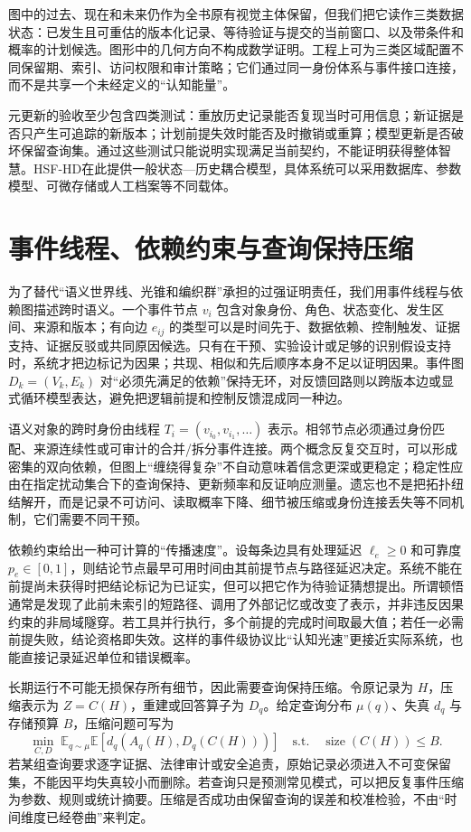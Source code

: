 图中的过去、现在和未来仍作为全书原有视觉主体保留，但我们把它读作三类数据状态：已发生且可重估的版本化记录、等待验证与提交的当前窗口、以及带条件和概率的计划候选。图形中的几何方向不构成数学证明。工程上可为三类区域配置不同保留期、索引、访问权限和审计策略；它们通过同一身份体系与事件接口连接，而不是共享一个未经定义的“认知能量”。

元更新的验收至少包含四类测试：重放历史记录能否复现当时可用信息；新证据是否只产生可追踪的新版本；计划前提失效时能否及时撤销或重算；模型更新是否破坏保留查询集。通过这些测试只能说明实现满足当前契约，不能证明获得整体智慧。HSF-HD在此提供一般状态—历史耦合模型，具体系统可以采用数据库、参数模型、可微存储或人工档案等不同载体。

\section{事件线程、依赖约束与查询保持压缩}

为了替代“语义世界线、光锥和编织群”承担的过强证明责任，我们用事件线程与依赖图描述跨时语义。一个事件节点 $v_i$ 包含对象身份、角色、状态变化、发生区间、来源和版本；有向边 $e_{ij}$ 的类型可以是时间先于、数据依赖、控制触发、证据支持、证据反驳或共同原因候选。只有在干预、实验设计或足够的识别假设支持时，系统才把边标记为因果；共现、相似和先后顺序本身不足以证明因果。事件图 $D_k=(V_k,E_k)$ 对“必须先满足的依赖”保持无环，对反馈回路则以跨版本边或显式循环模型表达，避免把逻辑前提和控制反馈混成同一种边。

语义对象的跨时身份由线程 $T_i=(v_{i_0},v_{i_1},\ldots)$ 表示。相邻节点必须通过身份匹配、来源连续性或可审计的合并/拆分事件连接。两个概念反复交互时，可以形成密集的双向依赖，但图上“缠绕得复杂”不自动意味着信念更深或更稳定；稳定性应由在指定扰动集合下的查询保持、更新频率和反证响应测量。遗忘也不是把拓扑纽结解开，而是记录不可访问、读取概率下降、细节被压缩或身份连接丢失等不同机制，它们需要不同干预。

依赖约束给出一种可计算的“传播速度”。设每条边具有处理延迟 $\ell_e\geq0$ 和可靠度 $p_e\in[0,1]$，则结论节点最早可用时间由其前提节点与路径延迟决定。系统不能在前提尚未获得时把结论标记为已证实，但可以把它作为待验证猜想提出。所谓顿悟通常是发现了此前未索引的短路径、调用了外部记忆或改变了表示，并非违反因果约束的非局域隧穿。若工具并行执行，多个前提的完成时间取最大值；若任一必需前提失败，结论资格即失效。这样的事件级协议比“认知光速”更接近实际系统，也能直接记录延迟单位和错误概率。

长期运行不可能无损保存所有细节，因此需要查询保持压缩。令原记录为 $H$，压缩表示为 $Z=C(H)$，重建或回答算子为 $D_q$。给定查询分布 $\mu(q)$、失真 $d_q$ 与存储预算 $B$，压缩问题可写为
\[
\min_{C,D}\;\mathbb{E}_{q\sim\mu}\mathbb{E}[d_q(A_q(H),D_q(C(H)))]
\quad\text{s.t.}\quad \operatorname{size}(C(H))\leq B.
\]
若某组查询要求逐字证据、法律审计或安全追责，原始记录必须进入不可变保留集，不能因平均失真较小而删除。若查询只是预测常见模式，可以把反复事件压缩为参数、规则或统计摘要。压缩是否成功由保留查询的误差和校准检验，不由“时间维度已经卷曲”来判定。

